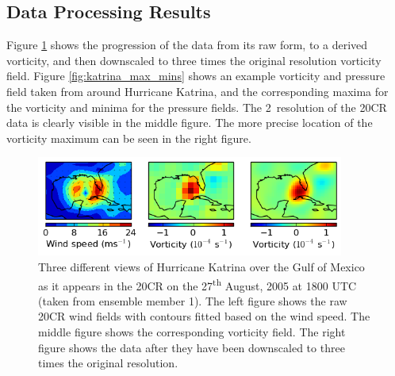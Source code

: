 \documentclass[pdftex,12pt,a4paper]{report}
\newcommand{\ts}{\textsuperscript}
\begin{document}
\subsection{Data Processing Results}

Figure \ref{fig:katrina_data_proc} shows the progression of the data from its raw form, to a derived
vorticity, and then downscaled to three times the original resolution vorticity field. Figure
\ref{fig:katrina_max_mins} shows an example vorticity and pressure field taken from around Hurricane
Katrina, and the corresponding maxima for the vorticity and minima for the pressure fields.
The 2\textdegree\ resolution of the 20CR data is clearly visible in the middle figure. The more
precise location of the vorticity maximum can be seen in the right figure.

\begin{figure}[hb!]
    \centering
    \includegraphics[width=0.9\textwidth]{figures/katrina_data_proc}
    \caption{Three different views of Hurricane Katrina over the Gulf of Mexico as it appears in the
        20CR on the 27\ts{th} August, 2005 at 1800 UTC (taken from ensemble member 1). The left
        figure shows the raw 20CR wind fields with contours fitted based on the wind speed. The
        middle figure shows the corresponding vorticity field. The right figure shows the data after
        they have been downscaled to three times the original resolution.}
    \label{fig:katrina_data_proc}
\end{figure}
\end{document}
